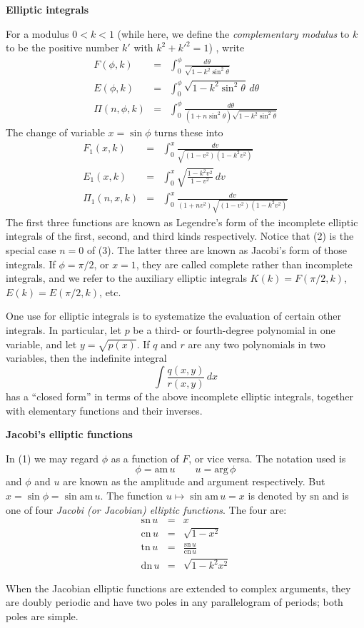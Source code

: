 \documentclass[12pt]{article}
\begin{document}
 
 
 
 
\textbf{Elliptic integrals}

For a modulus $0<k<1$ (while here, we define the \emph{complementary modulus} to $k$ to be the positive number $k'$ with $k^2+k'^2=1$) , write
\begin{eqnarray}
F(\phi,k)&=&\int_0^\phi\frac{d\theta}{\sqrt{1-k^2\sin^2\theta}} \\
E(\phi,k)&=&\int_0^\phi\sqrt{1-k^2\sin^2\theta}\,d\theta \\
\Pi(n,\phi,k)&=&\int_0^\phi\frac{d\theta}{(1+n\sin^2\theta)\sqrt{1-k^2\sin^2\theta}}
\end{eqnarray}
The change of variable $x=\sin\phi$ turns these into
\begin{eqnarray}
F_1(x,k)&=&\int_0^x\frac{dv}{\sqrt{(1-v^2)(1-k^2v^2)}} \\
E_1(x,k)&=&\int_0^x\sqrt{\frac{1-k^2v^2}{1-v^2}}\,dv \\
\Pi_1(n,x,k)&=&\int_0^x\frac{dv}{(1+nv^2)\sqrt{(1-v^2)(1-k^2v^2)}}
\end{eqnarray}
The first three functions are known as Legendre's form of the incomplete
elliptic integrals of the first, second, and third kinds respectively.
Notice that (2) is the special case $n=0$ of (3).
The latter three are known as Jacobi's form of those integrals.
If $\phi=\pi/2$, or $x=1$, they are called complete rather than incomplete
integrals, and we refer to the auxiliary elliptic integrals $K(k)=F(\pi/2,k)$, $E(k)=E(\pi/2,k)$, etc.

One use for elliptic integrals is to systematize the evaluation of
certain other integrals.
In particular, let $p$ be a third- or fourth-degree polynomial
in one variable, and let $y=\sqrt{p(x)}$.
If $q$ and $r$ are any two polynomials in two variables, then the
indefinite integral
$$\int\frac{q(x,y)}{r(x,y)}\,dx$$
has a ``closed form'' in terms of the above incomplete elliptic integrals,
together with elementary functions and their inverses.

\textbf{Jacobi's elliptic functions}

In (1) we may regard $\phi$ as a function of $F$, or vice versa.
The notation used is
$$\phi=\mathrm{am}\,u\qquad u=\mathrm{arg}\,\phi$$
and $\phi$ and $u$ are known as the amplitude and argument respectively.
But $x=\sin\phi=\sin\mathrm{am}\,u$.
The function $u\mapsto \sin\mathrm{am}\,u=x$
is denoted by $\mathrm{sn}$ and is one of four \emph{Jacobi (or Jacobian)
elliptic functions}. The four are:
\begin{eqnarray*}
\mathrm{sn}\,u&=&x \\
\mathrm{cn}\,u&=&\sqrt{1-x^2} \\
\mathrm{tn}\,u&=&\frac{\mathrm{sn}\,u}{\mathrm{cn}\,u} \\
\mathrm{dn}\,u&=&\sqrt{1-k^2x^2}
\end{eqnarray*}

When the Jacobian elliptic functions are extended to complex arguments,
they are doubly periodic and have two poles in any parallelogram of
periods; both poles are simple.
\end{document}
